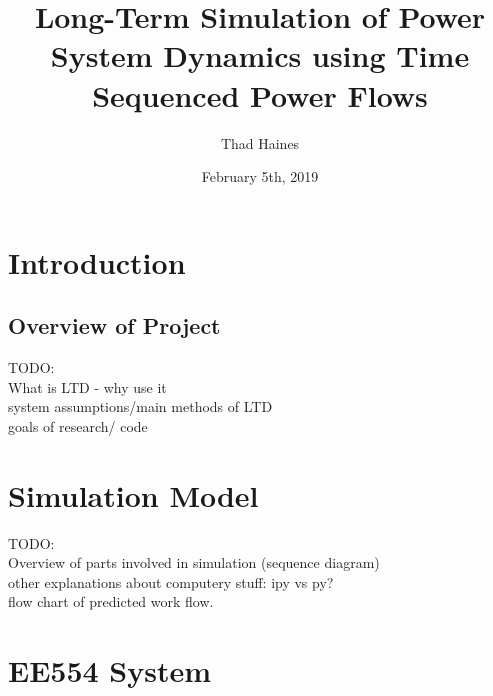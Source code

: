 \documentclass[14pt, unknownkeysallowed]{beamer}
\title{Long-Term Simulation of Power System Dynamics using Time Sequenced Power Flows}
\author{Thad Haines}
\institute[MT TECH]{Montana Tech - Master's Thesis Research Project}
\date{February 5th, 2019}
\begin{document}
\begin{frame}
\titlepage
\end{frame}

\section{Introduction}
\subsection{Overview of Project}
\begin{frame}
TODO:\\
What is LTD - why use it \\
system assumptions/main methods of LTD\\
goals of research/ code
\end{frame}

\section{Simulation Model}
\begin{frame}
TODO:\\
Overview of parts involved in simulation (sequence diagram)\\
other explanations about computery stuff: ipy vs py? \\
flow chart of predicted work flow.
\end{frame}

\section{EE554 System}
\end{document}
